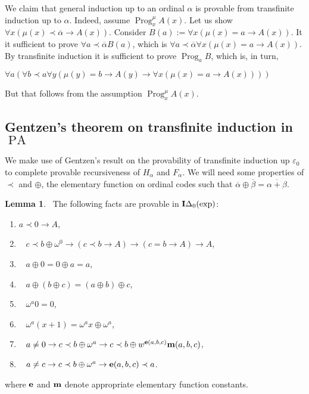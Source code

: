 \documentclass[8pt]{article}
\theoremstyle{definition}
\theoremstyle{definition}
\theoremstyle{definition}
\theoremstyle{definition}
\theoremstyle{definition}
\theoremstyle{definition}
\theoremstyle{definition}
\theoremstyle{definition}
\newtheorem{lemma}{Lemma}[section]
\theoremstyle{definition}
\theoremstyle{definition}
\theoremstyle{definition}
\theoremstyle{definition}
\theoremstyle{definition}
\theoremstyle{question}
\begin{document}
We claim that general induction up to an ordinal $\alpha$ is provable from transfinite
induction up to $\alpha$. Indeed, assume $\operatorname{Prog}^{\mu}_x A(x)$. Let us show 
$\forall x (\mu(x) \prec \overline{\alpha} \to A(x))$. Consider $B(a) := \forall x(\mu(x) = a \to A(x))$.
It it sufficient to prove $\forall a \prec \overline{\alpha}B(a)$, which is 
$\forall a \prec \overline{\alpha} \forall x (\mu(x) = a \to A(x))$. By transfinite induction it is sufficient to
prove $\operatorname{Prog}_a B$, which is, in turn,
\begin{center}
  $\forall a (\forall b \prec a \forall y (\mu(y) = b \to A(y) \to \forall x (\mu(x) = a \to A(x))))$
\end{center}

But that follows from the assumption $\operatorname{Prog}^{\mu}_x A(x)$.

\subsection{Gentzen's theorem on transfinite induction in $\operatorname{PA}$}

We make use of Gentzen's result on the provability of transfinite induction up $\varepsilon_0$
to complete provable recursiveness of $H_{\alpha}$ and $F_{\alpha}$.
We will need some properties of $\prec$ and $\oplus$, the elementary function on ordinal codes
such that $\overline{\alpha} \oplus \overline{\beta} = \overline{\alpha + \beta}$.

\begin{lemma}~\label{plus:code} The following facts are provable in ${\bf I}\Delta_0(\operatorname{exp})$:

  \begin{enumerate}
    \item $a \prec 0 \to A$,
    \item~\label{plus:code:2} $c \prec b \oplus \omega^0 \to (c \prec b \to A) \to (c = b \to A) \to A$,
    \item~\label{plus:code:3} $a \oplus 0 = 0 \oplus a = a$,
    \item~\label{plus:code:4} $a \oplus (b \oplus c) = (a \oplus b) \oplus c$,
    \item~\label{plus:code:5} $\omega^a 0 = 0$,
    \item~\label{plus:code:6} $\omega^a(x + 1) = \omega^a x \oplus \omega^a$,
    \item~\label{plus:code:7} $a \neq 0 \to c \prec b \oplus \omega^a \to c \prec b \oplus w^{{\bf e}(a, b,c)} {\bf m}(a, b, c)$,
    \item~\label{plus:code:8} $a \neq c \to c \prec b \oplus \omega^a \to {\bf e}(a, b, c) \prec a$.
  \end{enumerate}
  where ${\bf e}$ and ${\bf m}$ denote appropriate elementary function constants.
\end{lemma}
\end{document}
